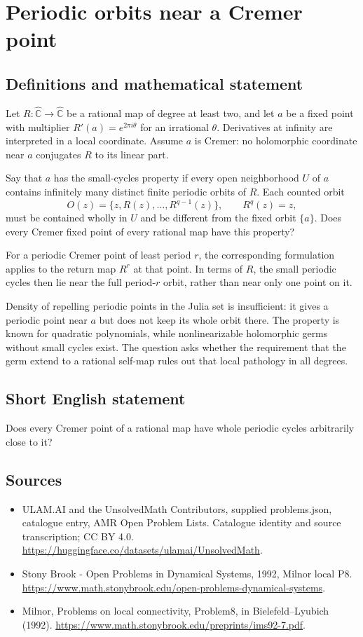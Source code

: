 \documentclass[11pt,a4paper]{article}
\begin{document}
\section*{Periodic orbits near a Cremer point}\label{statement}

\subsection{Definitions and mathematical statement}
Let $R:\widehat{\mathbb C}\to\widehat{\mathbb C}$ be a rational map of
degree at least two, and let $a$ be a fixed point with multiplier
$R'(a)=e^{2\pi i\theta}$ for an irrational $\theta$. Derivatives at
infinity are interpreted in a local coordinate. Assume $a$ is Cremer:
no holomorphic coordinate near $a$ conjugates $R$ to its linear part.

Say that $a$ has the small-cycles property if every open neighborhood
$U$ of $a$ contains infinitely many distinct finite periodic orbits
of $R$. Each counted orbit
\[
 O(z)=\{z,R(z),\ldots,R^{q-1}(z)\},\qquad R^q(z)=z,
\]
must be contained wholly in $U$ and be different from the fixed orbit
$\{a\}$. Does every Cremer fixed point of every rational map have this
property?

For a periodic Cremer point of least period $r$, the corresponding
formulation applies to the return map $R^r$ at that point. In terms
of $R$, the small periodic cycles then lie near the full period-$r$
orbit, rather than near only one point on it.

Density of repelling periodic points in the Julia set is insufficient:
it gives a periodic point near $a$ but does not keep its whole orbit
there. The property is known for quadratic polynomials, while
nonlinearizable holomorphic germs without small cycles exist. The
question asks whether the requirement that the germ extend to a
rational self-map rules out that local pathology in all degrees.
\subsection{Short English statement}
Does every Cremer point of a rational map have whole periodic cycles arbitrarily close to it?
\subsection{Sources}
\begin{itemize}
\item[S1] ULAM.AI and the UnsolvedMath Contributors, supplied problems.json, catalogue entry, AMR Open Problem Lists. Catalogue identity and source transcription; CC BY 4.0.
\url{https://huggingface.co/datasets/ulamai/UnsolvedMath}.
\item[S2] Stony Brook - Open Problems in Dynamical Systems, 1992, Milnor local P8. 
\url{https://www.math.stonybrook.edu/open-problems-dynamical-systems}.
\item[S3] Milnor, Problems on local connectivity, Problem8, in Bielefeld–Lyubich (1992).
\url{https://www.math.stonybrook.edu/preprints/ims92-7.pdf}.
\end{itemize}
\end{document}
